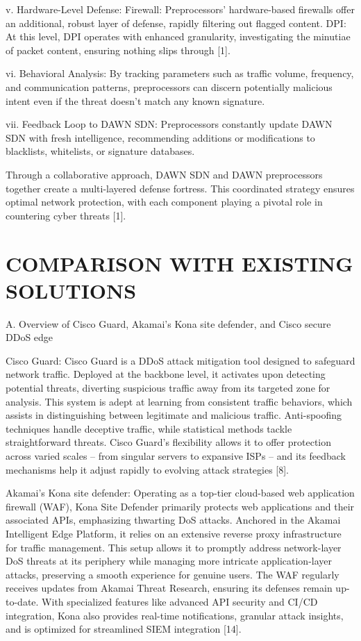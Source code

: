 \documentclass[conference]{IEEEtran}
\begin{document}
v. Hardware-Level Defense:
Firewall: Preprocessors' hardware-based firewalls offer an additional, robust layer of defense, rapidly filtering out flagged content.
DPI: At this level, DPI operates with enhanced granularity, investigating the minutiae of packet content, ensuring nothing slips through [1].

vi. Behavioral Analysis:
By tracking parameters such as traffic volume, frequency, and communication patterns, preprocessors can discern potentially malicious intent even if the threat doesn't match any known signature.

vii. Feedback Loop to DAWN SDN:
Preprocessors constantly update DAWN SDN with fresh intelligence, recommending additions or modifications to blacklists, whitelists, or signature databases.

Through a collaborative approach, DAWN SDN and DAWN preprocessors together create a multi-layered defense fortress. This coordinated strategy ensures optimal network protection, with each component playing a pivotal role in countering cyber threats [1].

\section{COMPARISON WITH EXISTING SOLUTIONS}
A. Overview of Cisco Guard, Akamai’s Kona site defender, and Cisco secure DDoS edge

Cisco Guard:
Cisco Guard is a DDoS attack mitigation tool designed to safeguard network traffic. Deployed at the backbone level, it activates upon detecting potential threats, diverting suspicious traffic away from its targeted zone for analysis. This system is adept at learning from consistent traffic behaviors, which assists in distinguishing between legitimate and malicious traffic. Anti-spoofing techniques handle deceptive traffic, while statistical methods tackle straightforward threats. Cisco Guard's flexibility allows it to offer protection across varied scales – from singular servers to expansive ISPs – and its feedback mechanisms help it adjust rapidly to evolving attack strategies [8].

Akamai’s Kona site defender:
Operating as a top-tier cloud-based web application firewall (WAF), Kona Site Defender primarily protects web applications and their associated APIs, emphasizing thwarting DoS attacks. Anchored in the Akamai Intelligent Edge Platform, it relies on an extensive reverse proxy infrastructure for traffic management. This setup allows it to promptly address network-layer DoS threats at its periphery while managing more intricate application-layer attacks, preserving a smooth experience for genuine users. The WAF regularly receives updates from Akamai Threat Research, ensuring its defenses remain up-to-date. With specialized features like advanced API security and CI/CD integration, Kona also provides real-time notifications, granular attack insights, and is optimized for streamlined SIEM integration [14].
\end{document}
